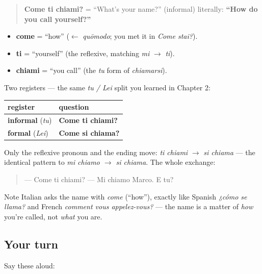 \begin{cousinweb}
\begin{quote}
\textbf{Come ti chiami?} = \textquotedblleft{}What's your name?\textquotedblright{} (informal) literally: \textbf{\textquotedblleft{}How do you call yourself?\textquotedblright{}}
\end{quote}

\begin{itemize}
\raggedright
  \item \textbf{come} = \textquotedblleft{}how\textquotedblright{} ($\leftarrow$ \emph{quōmodo}; you met it in \emph{Come stai?}).
  \item \textbf{ti} = \textquotedblleft{}yourself\textquotedblright{} (the reflexive, matching \emph{mi} $\to$ \emph{ti}).
  \item \textbf{chiami} = \textquotedblleft{}you call\textquotedblright{} (the \emph{tu} form of \emph{chiamarsi}).
\end{itemize}

Two registers — the same \emph{tu / Lei} split you learned in Chapter 2:

\noindent
\begin{tabularx}{\linewidth}{@{}>{\raggedright\arraybackslash}X>{\raggedright\arraybackslash}X@{}}
\toprule
\textbf{register} & \textbf{question} \\
\midrule
\textbf{informal} (\emph{tu}) & \textbf{Come ti chiami?} \\
\textbf{formal} (\emph{Lei}) & \textbf{Come si chiama?} \\
\bottomrule
\end{tabularx}

Only the reflexive pronoun and the ending move: \emph{ti chiami} $\to$ \emph{si chiama} — the identical pattern to \emph{mi chiamo $\to$ si chiama}. The whole exchange:

\begin{quote}
— Come ti chiami? — Mi chiamo Marco. E tu?
\end{quote}

Note Italian asks the name with \emph{come} (\textquotedblleft{}how\textquotedblright{}), exactly like Spanish \emph{¿cómo se llama?} and French \emph{comment vous appelez-vous?} — the name is a matter of \emph{how} you're called, not \emph{what} you are.
\end{cousinweb}

\subsection*{Your turn}
Say these aloud:

